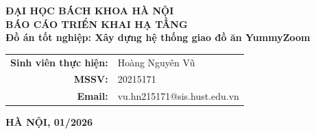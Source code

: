 \documentclass[InfraReport.tex]{subfiles}
\begin{document}
\begin{titlepage}
\thispagestyle{empty}
\begin{center}

    {\textbf{\large{ĐẠI HỌC BÁCH KHOA HÀ NỘI}}}\\[5.5cm]

    {\textbf{\huge{BÁO CÁO TRIỂN KHAI HẠ TẦNG}}}\\[0.8cm]
    {\textbf{\Large{Đồ án tốt nghiệp: Xây dựng hệ thống giao đồ ăn YummyZoom}}}\\[3cm]

    \begin{table}[H]
        \centering
        \begin{tabular}{rl}
            \textbf{Sinh viên thực hiện:} & Hoàng Nguyên Vũ \\
            \textbf{MSSV:} & 20215171 \\
            \textbf{Email:} & vu.hn215171@sis.hust.edu.vn \\
        \end{tabular}
    \end{table}

    \vfill
    {\textbf{\large{HÀ NỘI, 01/2026}}}
\end{center}
\end{titlepage}
\end{document}
